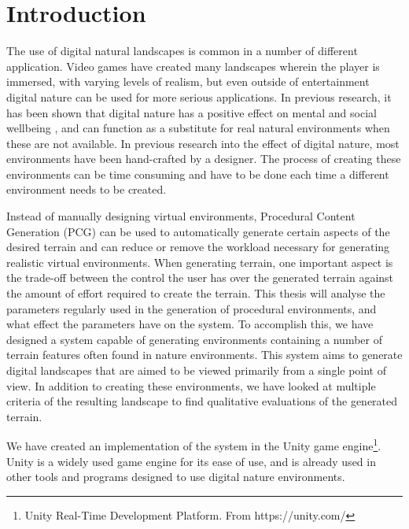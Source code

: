 \section{Introduction}
The use of digital natural landscapes is common in a number of different application. Video games have created many landscapes wherein the player is immersed, with varying levels of realism, but even outside of entertainment digital nature can be used for more serious applications. In previous research, it has been shown that digital nature has a positive effect on mental and social wellbeing \cite{van_houwelingen-snippe_feeling_2020}, and can function as a substitute for real natural environments when these are not available. In previous research into the effect of digital nature, most environments have been hand-crafted by a designer. The process of creating these environments can be time consuming and have to be done each time a different environment needs to be created.

Instead of manually designing virtual environments, Procedural Content Generation (PCG) can be used to automatically generate certain aspects of the desired terrain and can reduce or remove the workload necessary for generating realistic virtual environments. When generating terrain, one important aspect is the trade-off between the control the user has over the generated terrain against the amount of effort required to create the terrain. This thesis will analyse the parameters regularly used in the generation of procedural environments, and what effect the parameters have on the system. To accomplish this, we have designed a system capable of generating environments containing a number of terrain features often found in nature environments. This system aims to generate digital landscapes that are aimed to be viewed primarily from a single point of view. In addition to creating these environments, we have looked at multiple criteria of the resulting landscape to find qualitative evaluations of the generated terrain.

We have created an implementation of the system in the Unity game engine\footnote{Unity Real-Time Development Platform. From https://unity.com/}. Unity is a widely used game engine for its ease of use, and is already used in other tools and programs designed to use digital nature environments.
